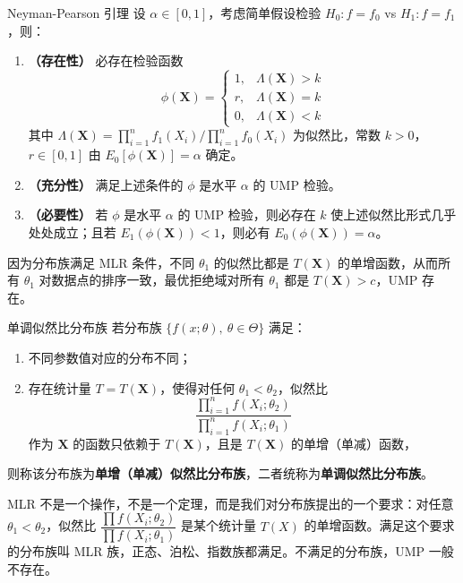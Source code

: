 \begin{theorem}{Neyman-Pearson 引理}{}
设 $\alpha \in [0,1]$，考虑简单假设检验 $H_0: f = f_0$ vs $H_1: f = f_1$，则：

\begin{enumerate}
    \item \textbf{（存在性）} 必存在检验函数
    $$\phi(\boldsymbol{X}) = \begin{cases} 1, & \Lambda(\boldsymbol{X}) > k \\ r, & \Lambda(\boldsymbol{X}) = k \\ 0, & \Lambda(\boldsymbol{X}) < k \end{cases}$$
    其中 $\Lambda(\boldsymbol{X}) = \prod_{i=1}^n f_1(X_i) / \prod_{i=1}^n f_0(X_i)$ 为似然比，常数 $k > 0$，$r \in [0,1]$ 由 $E_0[\phi(\boldsymbol{X})] = \alpha$ 确定。

    \item \textbf{（充分性）} 满足上述条件的 $\phi$ 是水平 $\alpha$ 的 UMP 检验。

    \item \textbf{（必要性）} 若 $\phi$ 是水平 $\alpha$ 的 UMP 检验，则必存在 $k$ 使上述似然比形式几乎处处成立；且若 $E_1(\phi(\boldsymbol{X})) < 1$，则必有 $E_0(\phi(\boldsymbol{X})) = \alpha$。
\end{enumerate}
\end{theorem}
\begin{note}
因为分布族满足 MLR 条件，不同 $\theta_1$ 的似然比都是 $T(\boldsymbol{X})$ 的单增函数，从而所有 $\theta_1$ 对数据点的排序一致，最优拒绝域对所有 $\theta_1$ 都是 $T(\boldsymbol{X}) > c$，UMP 存在。
\end{note}
\begin{definition}{单调似然比分布族}{}
若分布族 $\{f(x;\theta),\ \theta \in \Theta\}$ 满足：
\begin{enumerate}
    \item 不同参数值对应的分布不同；
    \item 存在统计量 $T = T(\boldsymbol{X})$，使得对任何 $\theta_1 < \theta_2$，似然比
    $$\frac{\prod_{i=1}^n f(X_i;\theta_2)}{\prod_{i=1}^n f(X_i;\theta_1)}$$
    作为 $\boldsymbol{X}$ 的函数只依赖于 $T(\boldsymbol{X})$，且是 $T(\boldsymbol{X})$ 的单增（单减）函数，
\end{enumerate}
则称该分布族为\textbf{单增（单减）似然比分布族}，二者统称为\textbf{单调似然比分布族}。
\end{definition}
\begin{note}
MLR 不是一个操作，不是一个定理，而是我们对分布族提出的一个要求：对任意 $\theta_1 < \theta_2$，似然比 $\dfrac{\prod f(X_i;\theta_2)}{\prod f(X_i;\theta_1)}$ 是某个统计量 $T(X)$ 的单增函数。满足这个要求的分布族叫 MLR 族，正态、泊松、指数族都满足。不满足的分布族，UMP 一般不存在。
\end{note}
